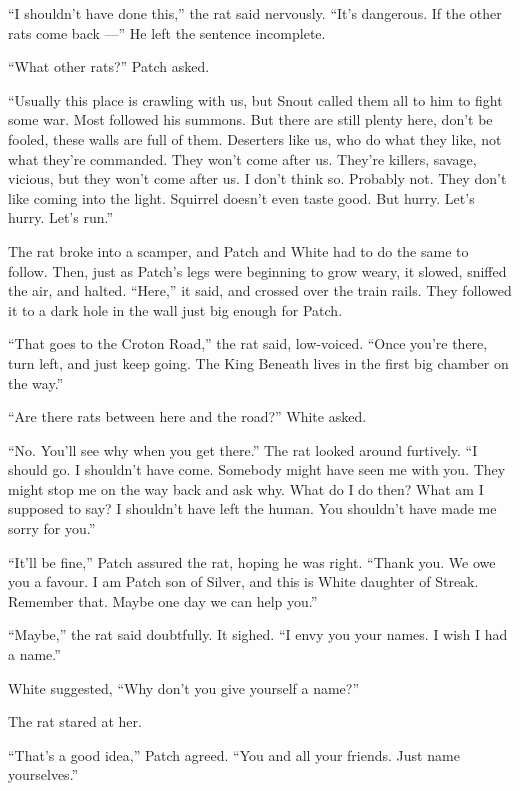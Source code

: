 \documentclass[ebook,oneside,openany,17pt]{memoir}
\newenvironment{tolerant}[1]{%
  \par\tolerance=#1\relax
}{%
  \par
}
\begin{document}
“I shouldn’t have done this,” the rat said nervously. “It’s
dangerous. If the other rats come back —” He left the sentence
incomplete.

“What other rats?” Patch asked.

\begin{tolerant}{5000}
“Usually this place is crawling with us, but Snout called them all to
him to fight some war. Most followed his summons. But there are still
plenty here, don’t be fooled, these walls are full of them. Deserters
like us, who do what they like, not what they’re commanded. They won’t
come after us. They’re killers, savage, vicious, but they won’t come
after us. I don’t think so. Probably not. They don’t like coming into
the light. Squirrel doesn’t even taste good. But hurry. Let’s
hurry. Let’s run.”
\end{tolerant}

\begin{tolerant}{1000}
The rat broke into a scamper, and Patch and White had to do the same
to follow. Then, just as Patch’s legs were beginning to grow weary, it
slowed, sniffed the air, and halted. “Here,” it said, and crossed over
the train rails. They followed it to a dark hole in the wall just big
enough for Patch.
\end{tolerant}

“That goes to the Croton Road,” the rat said, low-voiced. “Once you’re
there, turn left, and just keep going. The King Beneath lives in the
first big chamber on the way.”

“Are there rats between here and the road?” White asked.

“No. You’ll see why when you get there.” The rat looked around
furtively. “I should go. I shouldn’t have come. Somebody might have
seen me with you. They might stop me on the way back and ask why. What
do I do then? What am I supposed to say? I shouldn’t have left the
human. You shouldn’t have made me sorry for you.”

“It’ll be fine,” Patch assured the rat, hoping he was right. “Thank
you. We owe you a favour. I am Patch son of Silver, and this is White
daughter of Streak. Remember that. Maybe one day we can help you.”

“Maybe,” the rat said doubtfully. It sighed. “I envy you your names. I
wish I had a name.”

White suggested, “Why don’t you give yourself a name?”

The rat stared at her.

“That’s a good idea,” Patch agreed. “You and all your friends. Just
name yourselves.”
\end{document}
